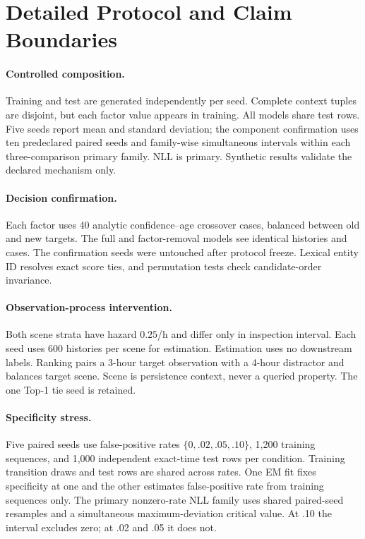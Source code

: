 \documentclass{article}
\begin{document}
\appendix
\small
\section{Detailed Protocol and Claim Boundaries}
\label{app:protocol}
\paragraph{Controlled composition.}
Training and test are generated independently per seed. Complete context tuples are disjoint, but each factor value appears in training. All models share test rows. Five seeds report mean and standard deviation; the component confirmation uses ten predeclared paired seeds and family-wise simultaneous intervals within each three-comparison primary family. NLL is primary. Synthetic results validate the declared mechanism only.

\paragraph{Decision confirmation.}
Each factor uses 40 analytic confidence--age crossover cases, balanced between old and new targets. The full and factor-removal models see identical histories and cases. The confirmation seeds were untouched after protocol freeze. Lexical entity ID resolves exact score ties, and permutation tests check candidate-order invariance.

\paragraph{Observation-process intervention.}
Both scene strata have hazard $0.25$/h and differ only in inspection interval. Each seed uses 600 histories per scene for estimation. Estimation uses no downstream labels. Ranking pairs a 3-hour target observation with a 4-hour distractor and balances target scene. Scene is persistence context, never a queried property. The one Top-1 tie seed is retained.

\paragraph{Specificity stress.}
Five paired seeds use false-positive rates $\{0,.02,.05,.10\}$, 1,200 training sequences, and 1,000 independent exact-time test rows per condition. Training transition draws and test rows are shared across rates. One EM fit fixes specificity at one and the other estimates false-positive rate from training sequences only. The primary nonzero-rate NLL family uses shared paired-seed resamples and a simultaneous maximum-deviation critical value. At .10 the interval excludes zero; at .02 and .05 it does not.
\end{document}
